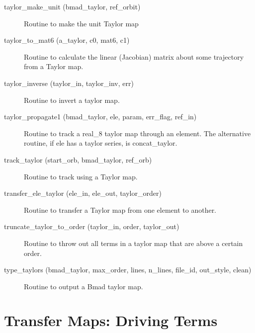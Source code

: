 \begin{description}
\label{r:taylor.make.unit}
\item[taylor_make_unit (bmad_taylor, ref_orbit)] \Newline
Routine to make the unit Taylor map

\label{r:taylor.to.mat6}
\item[taylor_to_mat6 (a_taylor, c0, mat6, c1)] \Newline
Routine to calculate the linear (Jacobian) matrix about some
trajectory from a Taylor map.

\label{r:taylor.inverse}
\item[taylor_inverse (taylor_in, taylor_inv, err)] \Newline
Routine to invert a taylor map. 

\label{r:taylor.propagate1}
\item[taylor_propagate1 (bmad_taylor, ele, param, err_flag, ref_in)] \Newline
Routine to track a real_8 taylor map through an element. 
The alternative routine, if ele has a taylor series, is concat_taylor. 

\label{r:track.taylor}
\item[track_taylor (start_orb, bmad_taylor, ref_orb)] \Newline
Routine to track using a Taylor map. 

\label{r:transfer.ele.taylor}
\item[transfer_ele_taylor (ele_in, ele_out, taylor_order)] \Newline 
Routine to transfer a Taylor map from one element to another.

\label{r:truncate.taylor.to.order}
\item[truncate_taylor_to_order (taylor_in, order, taylor_out)] \Newline 
Routine to throw out all terms in a taylor map that are above a certain order.

\label{r:type.taylors}
\item[type_taylors (bmad_taylor, max_order, lines, n_lines, file_id, out_style, clean)] \Newline
Routine to output a Bmad taylor map.

\end{description}


\section{Transfer Maps: Driving Terms}
\label{r:driving.terms}   

